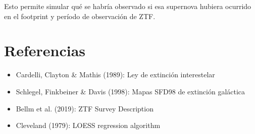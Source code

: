\documentclass[11pt,a4paper]{article}
\begin{document}
Esto permite simular qué se habría observado si esa supernova hubiera ocurrido en el footprint y período de observación de ZTF.

\section{Referencias}

\begin{itemize}
    \item Cardelli, Clayton \& Mathis (1989): Ley de extinción interestelar
    \item Schlegel, Finkbeiner \& Davis (1998): Mapas SFD98 de extinción galáctica
    \item Bellm et al. (2019): ZTF Survey Description
    \item Cleveland (1979): LOESS regression algorithm
\end{itemize}
\end{document}
